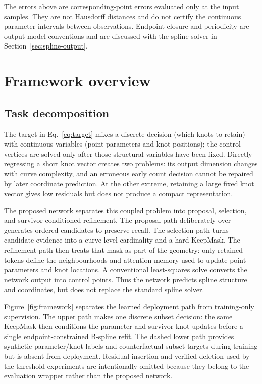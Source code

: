\documentclass[preprint,12pt]{elsarticle}
\begin{document}
The errors above are corresponding-point errors evaluated only at the input
samples. They are not Hausdorff distances and do not certify the continuous
parameter intervals between observations. Endpoint closure and periodicity
are output-model conventions and are discussed with the spline solver in
Section~\ref{sec:spline-output}.

\section{Framework overview}
\subsection{Task decomposition}
The target in Eq.~\eqref{eq:target} mixes a discrete decision (which knots to
retain) with continuous variables (point parameters and knot positions); the
control vertices are solved only after those structural variables have been
fixed. Directly regressing a short knot vector creates two problems: its output
dimension changes with curve complexity, and an erroneous early count decision
cannot be repaired by later coordinate prediction. At the other extreme,
retaining a large fixed knot vector gives low residuals but does not produce a
compact representation.

The proposed network separates this coupled problem into proposal, selection,
and survivor-conditioned refinement. The proposal path deliberately
over-generates ordered candidates to preserve recall. The selection path turns
candidate evidence into a curve-level cardinality and a hard KeepMask. The
refinement path then treats that mask as part of the geometry: only retained
tokens define the neighbourhoods and attention memory used to update point
parameters and knot locations. A conventional least-squares solve converts the
network output into control points. Thus the network predicts spline structure
and coordinates, but does not replace the standard spline solver.

Figure~\ref{fig:framework} separates the learned deployment path from
training-only supervision. The upper path makes one discrete subset decision:
the same KeepMask then conditions the parameter and survivor-knot updates
before a single endpoint-constrained B-spline refit. The dashed lower path
provides synthetic parameter/knot labels and counterfactual subset targets
during training but is absent from deployment. Residual insertion and verified
deletion used by the threshold experiments are intentionally omitted because
they belong to the evaluation wrapper rather than the proposed network.
\end{document}
